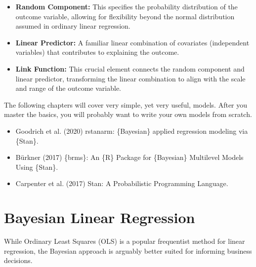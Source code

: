 \documentclass[
  letterpaper,
  DIV=11,
  numbers=noendperiod]{scrreprt}
\providecommand{\tightlist}{%
  \setlength{\itemsep}{0pt}\setlength{\parskip}{0pt}}\usepackage{longtable,booktabs,array}
\begin{document}
\begin{itemize}
\item
  \textbf{Random Component:} This specifies the probability distribution
  of the outcome variable, allowing for flexibility beyond the normal
  distribution assumed in ordinary linear regression.
\item
  \textbf{Linear Predictor:} A familiar linear combination of covariates
  (independent variables) that contributes to explaining the outcome.
\item
  \textbf{Link Function:} This crucial element connects the random
  component and linear predictor, transforming the linear combination to
  align with the scale and range of the outcome variable.
\end{itemize}

The following chapters will cover very simple, yet very useful, models.
After you master the basics, you will probably want to write your own
models from scratch.

\begin{tcolorbox}[enhanced jigsaw, colframe=quarto-callout-tip-color-frame, left=2mm, toprule=.15mm, colbacktitle=quarto-callout-tip-color!10!white, title=\textcolor{quarto-callout-tip-color}{\faLightbulb}\hspace{0.5em}{Learn more}, coltitle=black, rightrule=.15mm, leftrule=.75mm, colback=white, arc=.35mm, bottomtitle=1mm, bottomrule=.15mm, breakable, titlerule=0mm, opacitybacktitle=0.6, toptitle=1mm, opacityback=0]

\begin{itemize}
\tightlist
\item
  Goodrich et al. (2020) rstanarm: \{Bayesian\} applied regression
  modeling via \{Stan\}.
\item
  Bürkner (2017) \{brms\}: An \{R\} Package for \{Bayesian\} Multilevel
  Models Using \{Stan\}.
\item
  Carpenter et al. (2017) Stan: A Probabilistic Programming Language.
\end{itemize}

\end{tcolorbox}

\chapter{Bayesian Linear Regression}\label{bayesian-linear-regression}

While Ordinary Least Squares (OLS) is a popular frequentist method for
linear regression, the Bayesian approach is arguably better suited for
informing business decisions.
\end{document}
